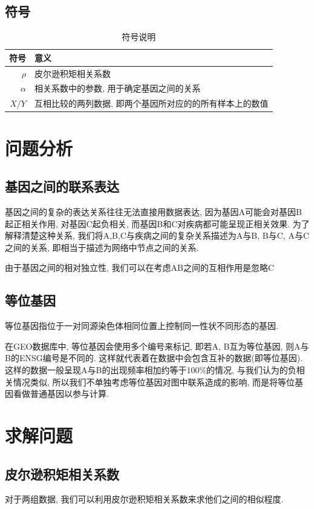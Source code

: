 \documentclass[zihao=-4]{ctexart}
\begin{document}
\subsection{符号}
\begin{table}[H]
    \centering
    \caption{符号说明}
    \begin{tabular}{r|l}
        \hline
        符号 & 意义\\
        \hline
        $\rho$ & 皮尔逊积矩相关系数\\
        $\alpha$ & 相关系数中的参数, 用于确定基因之间的关系\\
        $X/Y$ & 互相比较的两列数据, 即两个基因所对应的的所有样本上的数值\\
        \hline
    \end{tabular}
\end{table}



\section{问题分析}
\subsection{基因之间的联系表达}
基因之间的复杂的表达关系往往无法直接用数据表达, 因为基因A可能会对基因B起正相关作用, 对基因C起负相关, 而基因B和C对疾病都可能呈现正相关效果. 为了解释清楚这种关系, 我们将A,B,C与疾病之间的复杂关系描述为A与B, B与C, A与C之间的关系, 即相当于描述为网络中节点之间的关系.

由于基因之间的相对独立性, 我们可以在考虑AB之间的互相作用是忽略C

\subsection{等位基因}
等位基因指位于一对同源染色体相同位置上控制同一性状不同形态的基因.

在GEO数据库中, 等位基因会使用多个编号来标记, 即若A, B互为等位基因, 则A与B的ENSG编号是不同的. 这样就代表着在数据中会包含互补的数据(即等位基因). 这样的数据一般呈现A与B的出现频率相加约等于100\%的情况, 与我们认为的负相关情况类似, 所以我们不单独考虑等位基因对图中联系造成的影响, 而是将等位基因看做普通基因以参与计算.

\section{求解问题}
\subsection{皮尔逊积矩相关系数}
对于两组数据, 我们可以利用皮尔逊积矩相关系数\cite{wiki:pierxun}来求他们之间的相似程度. 
\end{document}
